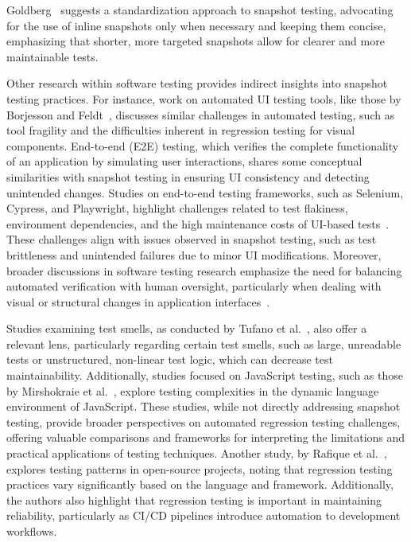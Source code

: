 \documentclass[
	msc, %
	english %
]{../ppgccufmg}
\begin{document}
        Goldberg~\cite{goldberg2023best} suggests a standardization approach to snapshot testing, advocating for the use of inline snapshots only when necessary and keeping them concise, emphasizing that shorter, more targeted snapshots allow for clearer and more maintainable tests.

        Other research within software testing provides indirect insights into snapshot testing practices. For instance, work on automated UI testing tools, like those by Borjesson and Feldt~\cite{Borjesson2012}, discusses similar challenges in automated testing, such as tool fragility and the difficulties inherent in regression testing for visual components. End-to-end (E2E) testing, which verifies the complete functionality of an application by simulating user interactions, shares some conceptual similarities with snapshot testing in ensuring UI consistency and detecting unintended changes. Studies on end-to-end testing frameworks, such as Selenium, Cypress, and Playwright, highlight challenges related to test flakiness, environment dependencies, and the high maintenance costs of UI-based tests~\cite{Stocco2018}. These challenges align with issues observed in snapshot testing, such as test brittleness and unintended failures due to minor UI modifications. Moreover, broader discussions in software testing research emphasize the need for balancing automated verification with human oversight, particularly when dealing with visual or structural changes in application interfaces~\cite{Garousi2020}. 
        
        Studies examining test smells, as conducted by Tufano et al.~\cite{tufano2016test}, also offer a relevant lens, particularly regarding certain test smells, such as large, unreadable tests or unstructured, non-linear test logic, which can decrease test maintainability. Additionally, studies focused on JavaScript testing, such as those by Mirshokraie et al.~\cite{mirshokraie2015jseft}, explore testing complexities in the dynamic language environment of JavaScript. These studies, while not directly addressing snapshot testing, provide broader perspectives on automated regression testing challenges, offering valuable comparisons and frameworks for interpreting the limitations and practical applications of testing techniques. Another study, by Rafique et al.~\cite{Rafique2012}, explores testing patterns in open-source projects, noting that regression testing practices vary significantly based on the language and framework. Additionally, the authors also highlight that regression testing is important in maintaining reliability, particularly as CI/CD pipelines introduce automation to development workflows.
\end{document}
